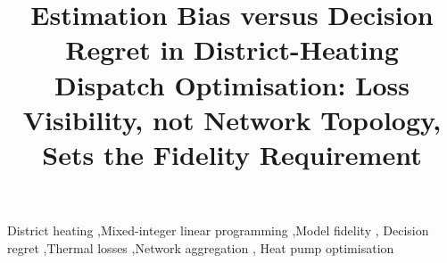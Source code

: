 \documentclass[a4paper,fleqn]{cas-dc}
\begin{document}
\title[mode=title]{%
  Estimation Bias versus Decision Regret in District-Heating Dispatch
  Optimisation: Loss Visibility, not Network Topology, Sets the Fidelity Requirement}

\begin{abstract}
\end{abstract}

\begin{keywords}
District heating \sep Mixed-integer linear programming \sep Model fidelity \sep
Decision regret \sep Thermal losses \sep Network aggregation \sep
Heat pump optimisation
\end{keywords}

\maketitle
\end{document}
